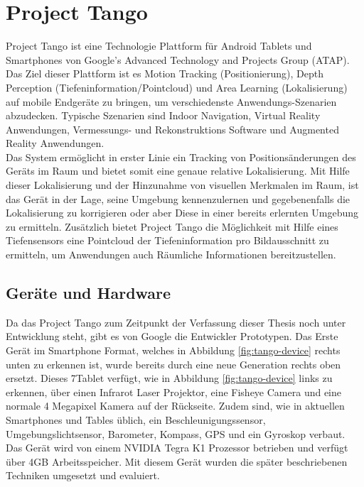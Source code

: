 
\section{Project Tango} \label{sec:theory_project_tango}

Project Tango ist eine Technologie Plattform für Android Tablets und Smartphones von Google’s Advanced Technology and Projects Group (ATAP). Das Ziel dieser Plattform ist es Motion Tracking (Positionierung), Depth Perception (Tiefeninformation/Pointcloud) und Area Learning (Lokalisierung) auf mobile Endgeräte zu bringen, um verschiedenste Anwendungs-Szenarien abzudecken. Typische Szenarien sind Indoor Navigation, Virtual Reality Anwendungen, Vermessungs- und Rekonstruktions Software und Augmented Reality Anwendungen.\\

Das System ermöglicht in erster Linie ein Tracking von Positionsänderungen des Geräts im Raum und bietet somit eine genaue relative Lokalisierung. Mit Hilfe dieser Lokalisierung und der Hinzunahme von visuellen Merkmalen im Raum, ist das Gerät in der Lage, seine Umgebung kennenzulernen und gegebenenfalls die Lokalisierung zu korrigieren oder aber Diese in einer bereits erlernten Umgebung zu ermitteln. Zusätzlich bietet Project Tango die Möglichkeit mit Hilfe eines Tiefensensors eine Pointcloud der Tiefeninformation pro Bildausschnitt zu ermitteln, um Anwendungen auch Räumliche Informationen bereitzustellen.  \citep{Proje19:online} \\

\subsection{Geräte und Hardware}

Da das Project Tango zum Zeitpunkt der Verfassung dieser Thesis noch unter Entwicklung steht, gibt es von Google die Entwickler Prototypen. Das Erste Gerät im Smartphone Format, welches in Abbildung \ref{fig:tango-device} rechts unten zu erkennen ist, wurde bereits durch eine neue Generation rechts oben ersetzt. Dieses 7\dq Tablet verfügt, wie in Abbildung \ref{fig:tango-device} links zu erkennen, über einen Infrarot Laser Projektor, eine Fisheye Camera und eine normale 4 Megapixel Kamera auf der Rückseite. Zudem sind, wie in aktuellen Smartphones und Tables üblich, ein Beschleunigungssensor, Umgebungslichtsensor, Barometer, Kompass, GPS und ein Gyroskop verbaut. Das Gerät wird von einem NVIDIA Tegra K1 Prozessor betrieben und verfügt über 4GB Arbeitsspeicher. \citep{Proje19:online} Mit diesem Gerät wurden die später beschriebenen Techniken umgesetzt und evaluiert. \\

